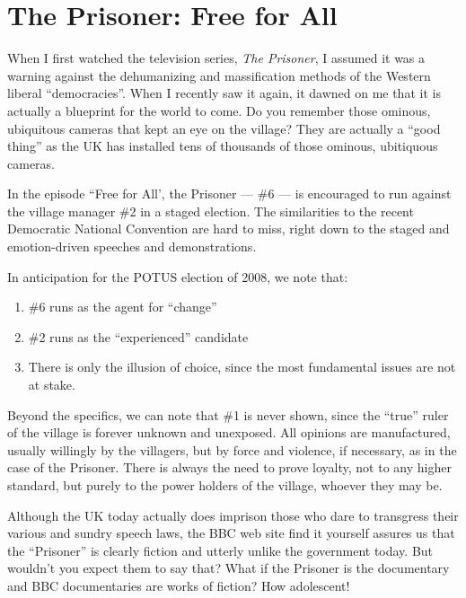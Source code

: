 \section{The Prisoner: Free for All}

When I first watched the television series, \emph{The Prisoner}, I assumed it was a warning against the dehumanizing and massification methods of the Western liberal ``democracies''. When I recently saw it again, it dawned on me that it is actually a blueprint for the world to come. Do you remember those ominous, ubiquitous cameras that kept an eye on the village? They are actually a ``good thing'' as the UK has installed tens of thousands of those ominous, ubitiquous cameras.

In the episode ``Free for All', the Prisoner --- \#6 --- is encouraged to run against the village manager \#2 in a staged election. The similarities to the recent Democratic National Convention are hard to miss, right down to the staged and emotion-driven speeches and demonstrations.

In anticipation for the POTUS election of 2008, we note that:

\begin{enumerate}
\item \#6 runs as the agent for ``change''
\item \#2 runs as the ``experienced'' candidate
\item There is only the illusion of choice, since the most fundamental issues are not at stake.
\end{enumerate}


Beyond the specifics, we can note that \#1 is never shown, since the ``true'' ruler of the village is forever unknown and unexposed. All opinions are manufactured, usually willingly by the villagers, but by force and violence, if necessary, as in the case of the Prisoner. There is always the need to prove loyalty, not to any higher standard, but purely to the power holders of the village, whoever they may be.

Although the UK today actually does imprison those who dare to transgress their various and sundry speech laws, the BBC web site find it yourself assures us that the ``Prisoner'' is clearly fiction and utterly unlike the government today. But wouldn't you expect them to say that? What if the Prisoner is the documentary and BBC documentaries are works of fiction? How adolescent!



